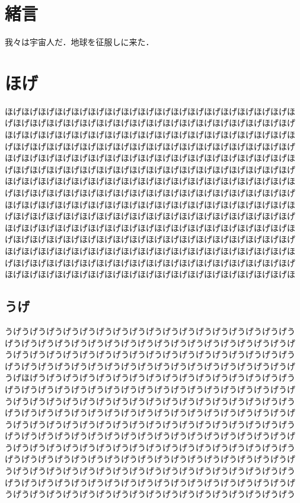 \begin{small}
 
\section{緒言}
我々は宇宙人\cite{Hondo:hohoge2006}だ．地球を征服しに来た．
 
\section{ほげ}
ほげほげほげほげほげほげほげほげほげほげほげほげほげほげほげほげほげほ
げほげほげほげほげほげほげほげほげほげほげほげほげほげほげほげほげほげ
ほげほげほげほげほげほげほげほげほげほげほげほげほげほげほげほげほげほ
げほげほげほげほげほげほげほげほげほげほげほげほげほげほげほげほげほげ
ほげほげほげほげほげほげほげほげほげほげほげほげほげほげほげほげほげほ
げほげほげほげほげほげほげほげほげほげほげほげほげほげほげほげほげほげ
ほげほげほげほげほげほげほげほげほげほげほげほげほげほげほげほげほげほ
げほげほげほげほげほげほげほげほげほげほげほげほげほげほげほげほげほげ
ほげほげほげほげほげほげほげほげほげほげほげほげほげほげほげほげほげほ
げほげほげほげほげほげほげほげほげほげほげほげほげほげほげほげほげほげ
ほげほげほげほげほげほげほげほげほげほげほげほげほげほげほげほげほげほ
げほげほげほげほげほげほげほげほげほげほげほげほげほげほげほげほげほげ
ほげほげほげほげほげほげほげほげほげほげほげほげほげほげほげほげほげほ
げほげほげほげほげほげほげほげほげほげほげほげほげほげほげほげほげほげ
ほげほげほげほげほげほげほげほげほげほげほげほげほげほげほげほげほげほ
 
\subsection{うげ}
うげうげうげうげうげうげうげうげうげうげうげうげうげうげうげうげうげう
げうげうげうげうげうげうげうげうげうげうげうげうげうげうげうげうげうげ
うげうげうげうげうげうげうげうげうげうげうげうげうげうげうげうげうげう
げうげうげうげうげうげうげうげうげうげうげうげうげうげうげうげうげうげ
うげほげうげうげうげうげうげうげうげうげうげうげうげうげうげうげうげう
げうげうげうげうげうげうげうげうげうげうげうげうげうげうげうげうげうげ
うげうげうげうげうげうげうげうげうげうげうげうげうげうげうげうげうげう
げうげうげうげうげうげうげうげうげうげうげうげうげうげうげうげうげうげ
うげうげうげうげうげうげうげうげうげうげうげうげうげうげうげうげうげう
げうげうげうげうげうげうげうげうげうげうげうげうげうげうげうげうげうげ
うげうげうげうげうげうげうげうげうげうげうげうげうげうげうげうげうげう
げうげうげうげうげうげうげうげうげうげうげうげうげうげうげうげうげうげ
うげうげうげうげうげうげうげうげうげうげうげうげうげうげうげうげうげう
げうげうげうげうげうげうげうげうげうげうげうげうげうげうげうげうげうげ
うげうげうげうげうげうげうげうげうげうげうげうげうげうげうげうげうげう
 

\end{small}
